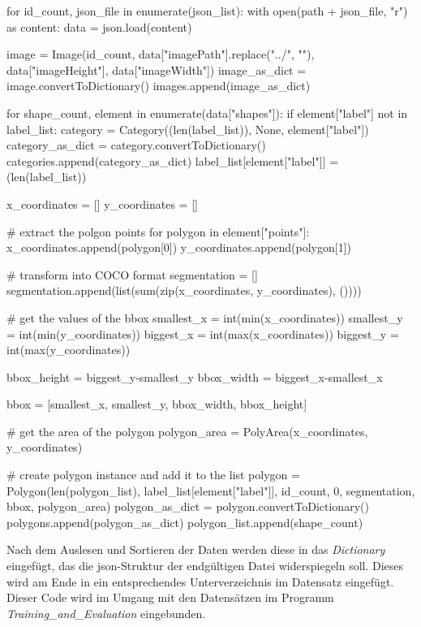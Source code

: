 \documentclass[a4paper,12pt,ngerman]{article}
\begin{document}
\begin{python}
for id_count, json_file in enumerate(json_list):
    with open(path + json_file, "r") as content:
        data = json.load(content)
        
        image = Image(id_count, data["imagePath"].replace("../", ""), data["imageHeight"], data["imageWidth"])
        image_as_dict = image.convertToDictionary()
        images.append(image_as_dict)

        for shape_count, element in enumerate(data["shapes"]):
            if element["label"] not in label_list:
                category = Category((len(label_list)), None, element["label"])
                category_as_dict = category.convertToDictionary()
                categories.append(category_as_dict)
                label_list[element["label"]] = (len(label_list))

            x_coordinates = []
            y_coordinates = []

            # extract the polgon points
            for polygon in element["points"]:
                x_coordinates.append(polygon[0])
                y_coordinates.append(polygon[1])

            # transform into COCO format
            segmentation = []
            segmentation.append(list(sum(zip(x_coordinates, y_coordinates), ())))

            # get the values of the bbox
            smallest_x = int(min(x_coordinates))
            smallest_y = int(min(y_coordinates))
            biggest_x = int(max(x_coordinates))
            biggest_y = int(max(y_coordinates))

            bbox_height = biggest_y-smallest_y
            bbox_width = biggest_x-smallest_x

            bbox = [smallest_x, smallest_y, bbox_width, bbox_height]

            # get the area of the polygon
            polygon_area = PolyArea(x_coordinates, y_coordinates)

            # create polygon instance and add it to the list
            polygon = Polygon(len(polygon_list), label_list[element["label"]], id_count, 0, segmentation, bbox, polygon_area)
            polygon_as_dict = polygon.convertToDictionary()
            polygons.append(polygon_as_dict)
            polygon_list.append(shape_count)
\end{python}

Nach dem Auslesen und Sortieren der Daten werden diese in das \textit{Dictionary} eingefügt, das die json-Struktur der endgültigen Datei widerspiegeln soll. Dieses wird am Ende in ein entsprechendes Unterverzeichnis im Datensatz eingefügt. Dieser Code wird im Umgang mit den Datensätzen im Programm \textit{Training\_and\_Evaluation} eingebunden. \\
\end{document}
